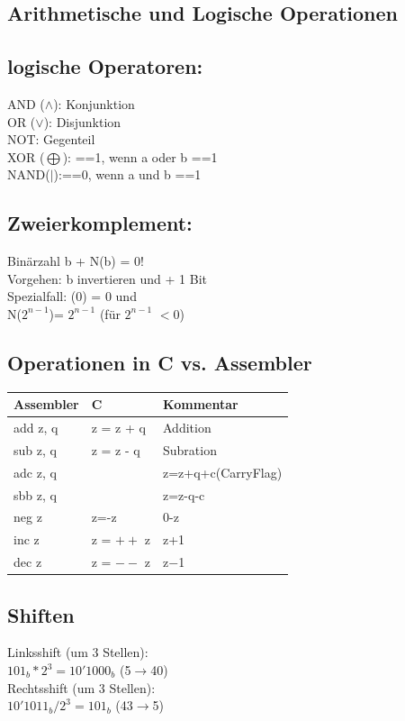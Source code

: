 \documentclass[8pt,landscape,a4paper]{scrartcl}
\begin{document}
\begin{multicols*}{5}
\section{Arithmetische und Logische Operationen}
\subsection{logische Operatoren:}
\textcolor{b}{AND ($\wedge$):} Konjunktion\\
\textcolor{b}{OR ($\vee$):} Disjunktion\\
\textcolor{b}{NOT:} Gegenteil\\
\textcolor{b}{XOR ($\bigoplus$):} ==1, wenn a oder b ==1\\
\textcolor{b}{NAND($|$):}==0, wenn a und b ==1\\
\subsection{Zweierkomplement:}
Binärzahl b + N(b) = 0!\\
Vorgehen: b invertieren und + 1 Bit\\
Spezialfall: (0) = 0 und \\
N($2^{n-1}$)= $2^{n-1}$ (für $2^{n-1}$ $<0$)

\subsection{Operationen in C vs. Assembler}
\begin{center}
	\begin{tabular}{p{1cm} | p{1.2cm} | p{2.2cm}}
		Assembler&C&Kommentar\\
		\hline
		add z, q&z = z + q&Addition\\
		sub z, q&z = z - q&Subration\\
		adc z, q&&z=z+q+c(CarryFlag)\\
		sbb z, q&&z=z-q-c\\
		neg z&z=-z&0-z\\
		inc z&z = $++$ z&z+1\\
		dec z&z = $--$ z&z$-$1\\
	\end{tabular}
\end{center}
\subsection{Shiften}
\textcolor{b}{Linksshift} (um 3 Stellen): \\
$101_b * 2^3 = 10'1000_b$ (5$\rightarrow$40)\\
\textcolor{b}{Rechtsshift} (um 3 Stellen):\\
$10'1011_b / 2^3 = 101_b$ (43$\rightarrow$5)\\


\end{multicols*}
\end{document}
